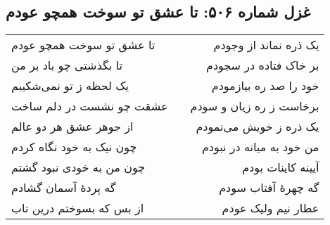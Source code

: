 \begin{center}
\section*{غزل شماره ۵۰۶: تا عشق تو سوخت همچو عودم}
\label{sec:506}
\begin{longtable}{l p{0.5cm} r}
تا عشق تو سوخت همچو عودم
&&
یک ذره نماند از وجودم
\\
تا بگذشتی چو باد بر من
&&
بر خاک فتاده در سجودم
\\
یک لحظه ز تو نمی‌شکیبم
&&
خود را صد ره بیازمودم
\\
عشقت چو نشست در دلم ساخت
&&
برخاست ز ره زیان و سودم
\\
از جوهر عشق هر دو عالم
&&
یک ذره ز خویش می‌نمودم
\\
چون نیک به خود نگاه کردم
&&
من خود به میانه در نبودم
\\
چون من به خودی نبود گشتم
&&
آیینه کاینات بودم
\\
گه پردهٔ آسمان گشادم
&&
گه چهرهٔ آفتاب سودم
\\
از بس که بسوختم درین تاب
&&
عطار نیم ولیک عودم
\\
\end{longtable}
\end{center}
